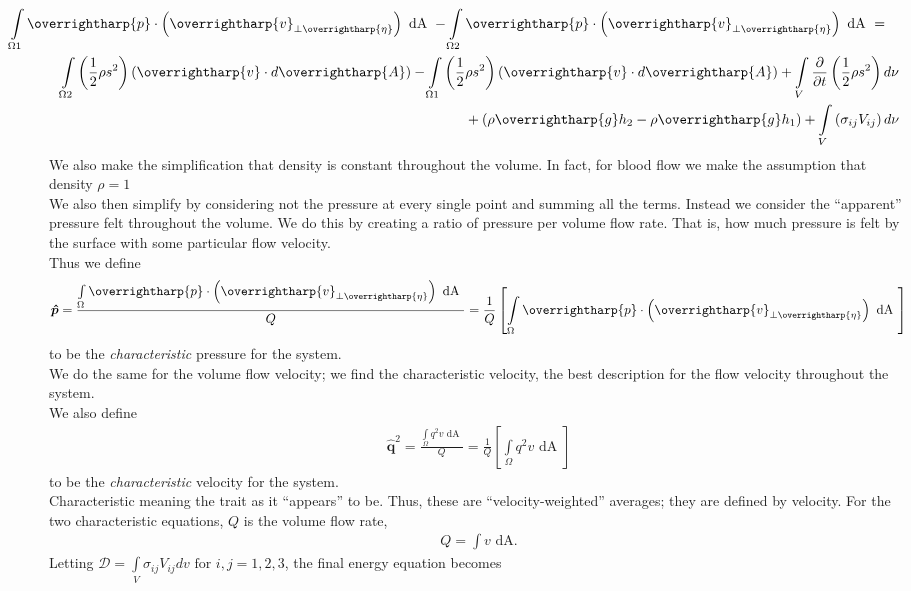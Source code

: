 \documentclass[12pt, a4paper]{article}
\theoremstyle{definition}
\theoremstyle{remark}
\theoremstyle{definition}
\newcommand*{\vtr}[1]{\text{\overrightharp{\ensuremath{#1}}}}
\newcommand{\?}{\stackrel{?}{=}}
\renewcommand{\it}[1]{\textit{#1}}
\begin{document}
\begin{align}
\begin{multlined}
\hspace{-0.5in}
\int\limits_{\Omega 1} 
	\vtr{p} \cdot 
\left(
	{\vtr{v}}_{\perp \vtr{\eta}}
\right) 
	\text{ dA }
- \int\limits_{\Omega 2} 
\vtr{p} \cdot 
\left({\vtr{v}}_{\perp \vtr{\eta}}
\right) 
\text{ dA }
=\\
\int\limits_{\Omega 2} 
\left(          
	\frac{1}{2}      \rho       {s}^{2}  
\right)     
	\left(      \vtr{v}   \cdot     d\vtr{A}      
\right)
-
\int\limits_{\Omega 1}  
\left(          
	\frac{1}{2}      \rho       {s}^{2}  
\right)     
	\left(      \vtr{v}   \cdot     d\vtr{A}      
\right)
+
\int\limits_{V} \frac{\partial}{\partial t} \left(\frac{1}{2} \rho {s}^{2} \right) d\nu 
\\
+
(\rho \vtr{g} {h}_{2} - \rho \vtr{g} {h}_{1})
+
\int\limits_{V} \left( {\sigma}_{ij}{V}_{ij} \right) d\nu
\end{multlined}
\end{align}
We also make the simplification that density is constant throughout the volume. In fact, for blood flow we make the assumption that density $\rho = 1$\\
We also then simplify by considering not the pressure at every single point and summing all the terms. Instead we consider the ``apparent'' pressure felt throughout the volume. We do this by creating a ratio of pressure per volume flow rate. That is, how much pressure is felt by the surface with some particular flow velocity.\\
Thus we define
\begin{align}
\boldsymbol{\hat{p}} = \frac{\int\limits_{\Omega} 
	\vtr{p} \cdot 
\left(
	{\vtr{v}}_{\perp \vtr{\eta}}
\right) 
	\text{ dA }}{Q} = \frac{1}{Q} \left[\int\limits_{\Omega} 
	\vtr{p} \cdot 
\left(
	{\vtr{v}}_{\perp \vtr{\eta}}
\right) 
	\text{ dA }\right]
\end{align}
to be the \it{characteristic} pressure for the system.\\
We do the same for the volume flow velocity; we find the characteristic velocity, the best description for the flow velocity throughout the system. \\
We also define 
\begin{align}
	\boldsymbol{{\hat{q}}}^{2} = \frac{\int\limits_{\Omega} 
	{q}^{2} v \text{ dA }}{Q} = 
	\frac{1}{Q} \left[
	\int\limits_{\Omega} 
	{q}^{2} v \text{ dA }
	\right]
\end{align}
to be the \it{characteristic} velocity for the system. \\
Characteristic meaning the trait as it ``appears'' to be. Thus, these are ``velocity-weighted'' averages; they are defined by velocity. For the two characteristic equations, $Q$ is the volume flow rate, 
\begin{align}
Q = \int\!\!\!\!v \text{ dA.}
\end{align}
Letting $\mathscr{D} = \displaystyle\int\limits_{V} {\sigma}_{ij} {V}_{ij}dv \text{ for } i,j = 1, 2, 3$, the final energy equation becomes 
\end{document}
